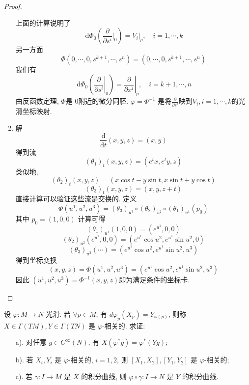 \documentclass[../main.tex]{subfiles}
\begin{document}
\begin{proof}
\begin{enumerate}
        上面的计算说明了 \[
        \,\mathrm{d} \Phi _0 \left( \frac{\partial }{\partial s^{i}}|_{0} \right) = \left. V_{i} \right|_{p},\quad i=  1,\cdots,k 
        \]另一方面 \[
        \Phi \left( 0,\cdots ,0,s^{k+ 1},\cdots ,s^{n} \right)= \left( 0,\cdots ,0,s^{k+ 1},\cdots ,s^{n} \right)  
        \]我们有 \[
        \,\mathrm{d} \Phi _0 \left( \left. \frac{\partial }{\partial s^{i}} \right|_{0} \right)= \left. \frac{\partial }{\partial x^{i}} \right|_{p},\quad i= k+ 1,\cdots ,n 
        \]由反函数定理, \(  \Phi   \)是 \(  0  \)附近的微分同胚.  \(   \varphi = \Phi ^{-1}   \) 是将\(  \frac{\partial }{\partial s^{i}}  \)映到\(  V_{i},i=  1,\cdots,k   \)的光滑坐标映射.  

        \item 解 \[
        \frac{\mathrm{d}}{\mathrm{d}t}\left( x,y,z \right)= \left( x,y \right)  
        \]得到流\[
        \left(  \theta _1  \right)_{t}\left( x,y,z \right)= \left( e^{t}x,e^{t}y,z \right)   
        \] 类似地,\[
        \left(  \theta _2  \right)_{t}\left( x,y,z \right)= \left( x\cos t-y\sin t, x\sin t+ y\cos t \right)   
        \] \[
        \left(  \theta _3  \right)_{t}\left( x,y,z \right)= \left( x,y,z+ t \right)   
        \]
        直接计算可以验证这些流是交换的. 定义 \[
        \Phi \left( u^{1},u^{2},u^{3} \right)= \left(  \theta _3  \right)_{u^{3}}\circ \left(  \theta _2  \right)_{u^{2}}\circ \left(  \theta _1  \right)_{u^{1}}\left( p_0 \right)     
        \]其中 \(  p_0= \left( 1,0,0 \right)   \) 
        计算可得 \[
        \left(  \theta _1  \right)_{u^{1}}\left( 1,0,0 \right)= \left( e^{u^{1}},0,0 \right)   
        \] \[
        \left(  \theta _2  \right)_{u^{2}}\left( e^{u^{1}},0,0 \right)= \left( e^{u^{1}}\cos u^{2},e^{u^{1}}\sin u^{2},0 \right)   
        \] \[
        \left(  \theta _3  \right)_{u^{3}}\left( \cdots  \right)= \left( e^{u^{1}}\cos u^{2},e^{u^{1}}\sin u^{2},u^{3} \right)   
        \]得到坐标变换 \[
        \left( x,y,z \right)= \Phi \left( u^{1},u^{2},u^{3} \right)= \left( e^{u^{1}}\cos u^{2},e^{u^{1}}\sin u^{2},u^{3} \right)   
        \] 因此 \(  \left( u^{1},u^{2},u^{3} \right)  = \Phi ^{-1} \left( x,y,z \right)  \)即为满足条件的坐标卡. 
    \end{enumerate}
    
\end{proof}

\begin{exercise}{}{}
设 $\varphi: M \to N$ 光滑. 若 $\forall p \in M$, 有 $d\varphi_p(X_p) = Y_{\varphi(p)}$, 则称 $X \in \Gamma(TM), Y \in \Gamma(TN)$ 是 $\varphi$-相关的. 求证:
\begin{enumerate}
\item[a).] 对任意 $g \in C^\infty(N)$, 有 $X(\varphi^*g) = \varphi^*(Yg)$;
\item[b).] 若 $X_i, Y_i$ 是 $\varphi$-相关的, $i=1,2$, 则 $[X_1, X_2], [Y_1, Y_2]$ 是 $\varphi$-相关的;
\item[c).] 若 $\gamma: I \to M$ 是 $X$ 的积分曲线, 则 $\varphi \circ \gamma: I \to N$ 是 $Y$ 的积分曲线.
\end{enumerate}
\end{exercise}
\end{document}
